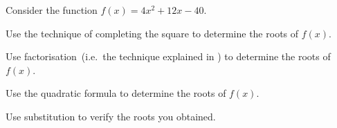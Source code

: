 \documentclass[a4paper,oneside,12pt]{article}
\begin{document}
\begin{exercise}
Consider the function $f(x) = 4x^2 + 12x - 40$.
\begin{packedenum}
\item\label{subeg:monic_quadratic_x2_x5_completing_square}
  Use the technique of completing the square to determine the roots of
  $f(x)$.

\item\label{subeg:monic_quadratic_x2_x5_factored_form}
  Use factorisation~(i.e.~the technique explained
  in ) to determine the roots of
  $f(x)$.

\item\label{subeg:monic_quadratic_x2_x5_quadratic_formula}
  Use the quadratic formula to determine the roots of $f(x)$.

\item\label{subeg:monic_quadratic_x2_x5_verify}
  Use substitution to verify the roots you obtained.
\end{packedenum}
\end{exercise}
\end{document}
